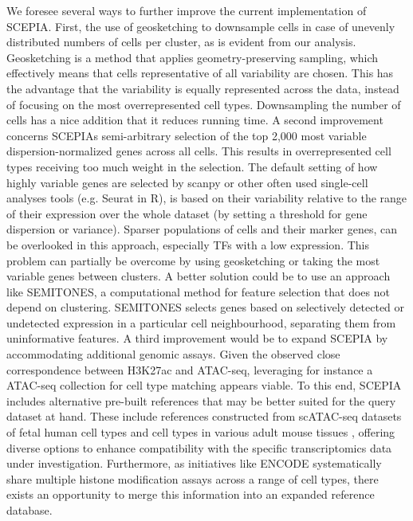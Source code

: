 We foresee several ways to further improve the current implementation of SCEPIA. First, the use of geosketching to downsample cells in case of unevenly distributed numbers of cells per cluster\cite{Hie2019}, as is evident from our analysis. Geosketching is a method that applies geometry-preserving sampling, which effectively means that cells representative of all variability are chosen. This has the advantage that the variability is equally represented across the data, instead of focusing on the most overrepresented cell types. Downsampling the number of cells has a nice addition that it reduces running time. A second improvement concerns SCEPIAs semi-arbitrary selection of the top 2,000 most variable dispersion-normalized genes across all cells. This results in overrepresented cell types receiving too much weight in the selection. The default setting of how highly variable genes are selected by scanpy or other often used single-cell analyses tools (e.g. Seurat in R), is based on their variability relative to the range of their expression over the whole dataset (by setting a threshold for gene dispersion or variance). Sparser populations of cells and their marker genes, can be overlooked in this approach, especially TFs with a low expression. This problem can partially be overcome by using geosketching or taking the most variable genes between clusters. A better solution could be to use an approach like SEMITONES\cite{Vlot2022}, a computational method for feature selection that does not depend on clustering. SEMITONES selects genes based on selectively detected or undetected expression in a particular cell neighbourhood, separating them from uninformative features. A third improvement would be to expand SCEPIA by accommodating additional genomic assays. Given the observed close correspondence between H3K27ac and ATAC-seq, leveraging for instance a ATAC-seq collection for cell type matching appears viable. To this end, SCEPIA includes alternative pre-built references that may be better suited for the query dataset at hand. These include references constructed from scATAC-seq datasets of fetal human cell types \cite{Domcke2020} and cell types in various adult mouse tissues \cite{Cusanovich2018}, offering diverse options to enhance compatibility with the specific transcriptomics data under investigation. Furthermore, as initiatives like ENCODE\cite{encode_dcc} systematically share multiple histone modification assays across a range of cell types, there exists an opportunity to merge this information into an expanded reference database. 

